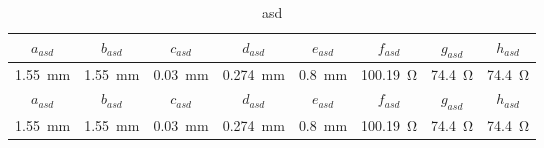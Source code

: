 \begin{table}[h!]
	\centering
	\begin{tabular}{|c|c|c|c|c|c|c|c|}
	\hline
	$a_{asd}$ & $b_{asd}$ & $c_{asd}$ & $d_{asd}$ & $e_{asd}$ & $f_{asd}$ & $g_{asd}$ & $h_{asd}$ \\ 
	\hline
	\SI{1,55}{mm} & \SI{1,55}{mm} & \SI{0,03}{mm} & \SI{0,274}{mm} & \SI{0,8}{mm} & \SI{100,19}{\ohm} & \SI{74,4}{\ohm} & \SI{74,4}{\ohm}\\
	\hline\hline
	$a_{asd}$ & $b_{asd}$ & $c_{asd}$ & $d_{asd}$ & $e_{asd}$ & $f_{asd}$ & $g_{asd}$ & $h_{asd}$ \\
	\hline
	\SI{1,55}{mm} & \SI{1,55}{mm} & \SI{0,03}{mm} & \SI{0,274}{mm} & \SI{0,8}{mm} & \SI{100,19}{\ohm} & \SI{74,4}{\ohm} & \SI{74,4}{\ohm}\\
	\hline
	\end{tabular}
	\caption{asd}
	\label{tab:balun-param}
\end{table}